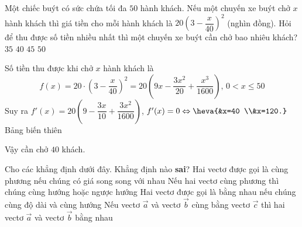 \begin{ex}%
	Một chiếc buýt có sức chứa tối đa $50$ hành khách. Nếu một chuyến xe buýt chở $x$ hành khách thì giá tiền cho mỗi hành khách là $20\left(3-\dfrac{x}{40}\right)^2$ (nghìn đồng). Hỏi để thu được số tiền nhiều nhất thì một chuyến xe buýt cần chở bao nhiêu khách?
	\choice
	{$35$}
	{\True $40$}
	{$45$}
	{$50$}
	\loigiai
	{
		Số tiền thu được khi chở $x$ hành khách là
		\[f(x)= 20\cdot \left(3-\dfrac{x}{40}\right)^2=20\left(9x-\dfrac{3x^2}{20}+\dfrac{x^3}{1600}\right),\,0<x\leq 50\]
		Suy ra $f'(x)=20\left(9-\dfrac{3x}{10}+\dfrac{3x^2}{1600}\right)$, $f'(x)=0\Leftrightarrow \heva{&x=40 \\&x=120.}$\\
		Bảng biến thiên
		\begin{center}
		\end{center}
		Vậy cần chở $40$ khách.
	}
\end{ex}

\begin{ex}%
	Cho các khẳng định dưới đây. Khẳng định nào \textbf{sai}?
	\choice
	{\True Hai vectơ được gọi là cùng phương nếu chúng có giá song song với nhau}
	{Nếu hai vectơ cùng phương thì chúng cùng hướng hoặc ngược hướng}
	{Hai vectơ được gọi là bằng nhau nếu chúng cùng độ dài và cùng hướng}
	{Nếu vectơ $ \overrightarrow{a}$ và vectơ $\overrightarrow{b}$ cùng bằng vectơ $\overrightarrow{c}$ thì hai vectơ $\overrightarrow{a}$ và vectơ $\overrightarrow{b}$ bằng nhau}
\end{ex}

